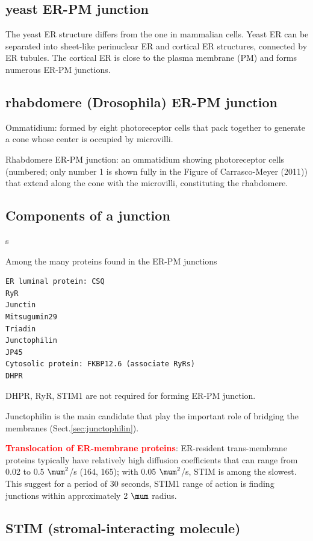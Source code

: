 \subsection{yeast ER-PM junction}

The yeast ER structure differs from the one in mammalian cells.
Yeast ER can be separated into sheet-like perinuclear ER and cortical ER
structures, connected by ER tubules. The cortical ER is close to the plasma
membrane (PM) and forms numerous ER-PM junctions.

\subsection{rhabdomere (Drosophila) ER-PM junction}

Ommatidium: formed by eight photoreceptor cells that pack together to generate a
cone whose center is occupied by microvilli.

Rhabdomere ER-PM junction: an ommatidium showing photoreceptor cells (numbered;
only number 1 is shown fully in the Figure of Carrasco-Meyer (2011)) that extend
along the cone with the microvilli, constituting the rhabdomere.


\subsection{Components of a junction}
\label{sec:junction-components}s

Among the many proteins found in the ER-PM junctions
\begin{verbatim}
ER luminal protein: CSQ
RyR
Junctin
Mitsugumin29
Triadin
Junctophilin
JP45
Cytosolic protein: FKBP12.6 (associate RyRs)
DHPR
\end{verbatim}
DHPR, RyR, STIM1 are not required for forming ER-PM junction.

Junctophilin is the main candidate that play the important role of bridging the
membranes (Sect.\ref{sec:junctophilin}).

\textcolor{red}{\bf Translocation of ER-membrane proteins}:
ER-resident trans-membrane proteins typically have relatively high diffusion
coefficients that can range from 0.02 to 0.5 $\mum^2$/s (164, 165); 
with 0.05 $\mum^2$/s, STIM is among the slowest. This suggest for a period of 30
seconds, STIM1 range of action is finding junctions within approximately 2
$\mum$ radius.


\subsection{STIM (stromal-interacting molecule)}
\label{sec:STIM}

